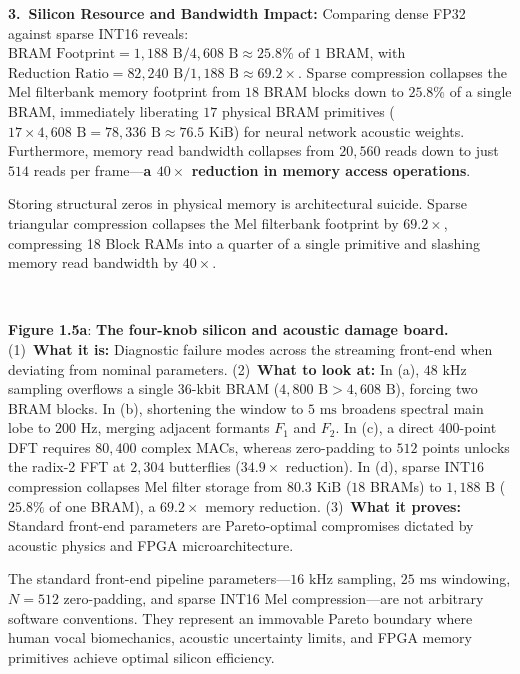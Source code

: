 \documentclass[11pt,a4paper]{article}
\begin{document}
\textbf{3.~Silicon Resource and Bandwidth Impact:} Comparing dense FP32 against sparse INT16 reveals:
$\text{BRAM Footprint} = 1{,}188\text{ B} / 4{,}608\text{ B} \approx 25.8\% \text{ of 1 BRAM}$, with $\text{Reduction Ratio} = 82{,}240\text{ B} / 1{,}188\text{ B} \approx 69.2\times$. Sparse compression collapses the Mel filterbank memory footprint from $18$ BRAM blocks down to $25.8\%$ of a single BRAM, immediately liberating $17$ physical BRAM primitives ($17 \times 4{,}608\text{ B} = 78{,}336\text{ B} \approx 76.5\text{ KiB}$) for neural network acoustic weights. Furthermore, memory read bandwidth collapses from $20{,}560$ reads down to just $514$ reads per frame---\textbf{a $40\times$ reduction in memory access operations}.

\begin{physicalinsight}
Storing structural zeros in physical memory is architectural suicide. Sparse triangular compression collapses the Mel filterbank footprint by $69.2\times$, compressing 18 Block RAMs into a quarter of a single primitive and slashing memory read bandwidth by $40\times$.
\end{physicalinsight}

\noindent\begin{minipage}{\textwidth}
\centering
\resizebox{0.92\textwidth}{!}{}\\[2pt]
{\scriptsize\textbf{Figure 1.5a}: \textbf{The four-knob silicon and acoustic damage board.} (1)~\textbf{What it is:} Diagnostic failure modes across the streaming front-end when deviating from nominal parameters. (2)~\textbf{What to look at:} In (a), $48\text{ kHz}$ sampling overflows a single 36-kbit BRAM ($4{,}800\text{ B} > 4{,}608\text{ B}$), forcing two BRAM blocks. In (b), shortening the window to $5\text{ ms}$ broadens spectral main lobe to $200\text{ Hz}$, merging adjacent formants $F_1$ and $F_2$. In (c), a direct 400-point DFT requires $80{,}400$ complex MACs, whereas zero-padding to $512$ points unlocks the radix-2 FFT at $2{,}304$ butterflies ($34.9\times$ reduction). In (d), sparse INT16 compression collapses Mel filter storage from $80.3\text{ KiB}$ ($18$ BRAMs) to $1{,}188\text{ B}$ ($25.8\%$ of one BRAM), a $69.2\times$ memory reduction. (3)~\textbf{What it proves:} Standard front-end parameters are Pareto-optimal compromises dictated by acoustic physics and FPGA microarchitecture.\par}
\end{minipage}

\begin{groundbreaking}
The standard front-end pipeline parameters---$16\text{ kHz}$ sampling, $25\text{ ms}$ windowing, $N=512$ zero-padding, and sparse INT16 Mel compression---are not arbitrary software conventions. They represent an immovable Pareto boundary where human vocal biomechanics, acoustic uncertainty limits, and FPGA memory primitives achieve optimal silicon efficiency.
\end{groundbreaking}
\end{document}
